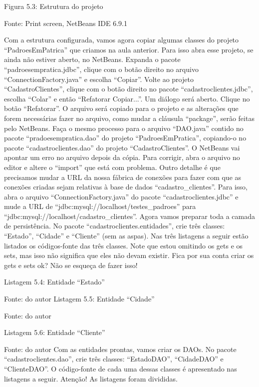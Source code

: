Figura 5.3: Estrutura do projeto
 
Fonte: Print screen, NetBeans IDE 6.9.1

Com a estrutura configurada, vamos agora copiar algumas classes do projeto ``PadroesEmPatrica'' que criamos na aula anterior. Para isso abra esse projeto, se ainda não estiver aberto, no NetBeans. Expanda o pacote ``padroesempratica.jdbc'', clique com o botão direito no arquivo ``ConnectionFactory.java'' e escolha ``Copiar''. Volte ao projeto ``CadastroClientes'', clique com o botão direito no pacote ``cadastroclientes.jdbc'', escolha ``Colar'' e então ``Refatorar Copiar...''. Um diálogo será aberto. Clique no botão ``Refatorar''. O arquivo será copiado para o projeto e as alterações que forem necessárias fazer no arquivo, como mudar a cláusula ``package'', serão feitas pelo NetBeans. Faça o mesmo processo para o arquivo ``DAO.java'' contido no pacote ``pradoesempratica.dao'' do projeto ``PadroesEmPratica'', copiando-o no pacote ``cadastroclientes.dao'' do projeto ``CadastroClientes''. O NetBeans vai apontar um erro no arquivo depois da cópia. Para corrigir, abra o arquivo no editor e altere o ``import'' que está com problema. 
Outro detalhe é que precisamos mudar a URL da nossa fábrica de conexões para fazer com que as conexões criadas sejam relativas à base de dados ``cadastro\_clientes''. Para isso, abra o arquivo ``ConnectionFactory.java'' do pacote ``cadastroclientes.jdbc'' e mude a URL de ``jdbc:mysql://localhost/testes\_padroes'' para ``jdbc:mysql://localhost/cadastro\_clientes''.
Agora vamos preparar toda a camada de persistência. No pacote ``cadastroclientes.entidades'', crie três classes: ``Estado'', ``Cidade'' e ``Cliente'' (sem as aspas). Nas três listagens a seguir estão listados os códigos-fonte das três classes. Note que estou omitindo os gets e os sets, mas isso não significa que eles não devam existir. Fica por sua conta criar os gets e sets ok? Não se esqueça de fazer isso!

Listagem 5.4: Entidade ``Estado''
 
Fonte: do autor
Listagem 5.5: Entidade ``Cidade''
 
Fonte: do autor








Listagem 5.6: Entidade ``Cliente''
 
Fonte: do autor
Com as entidades prontas, vamos criar os DAOs. No pacote ``cadastroclientes.dao'', crie três classes: ``EstadoDAO'', ``CidadeDAO'' e ``ClienteDAO''. O código-fonte de cada uma dessas classes é apresentado nas listagens a seguir. Atenção! As listagens foram divididas.











